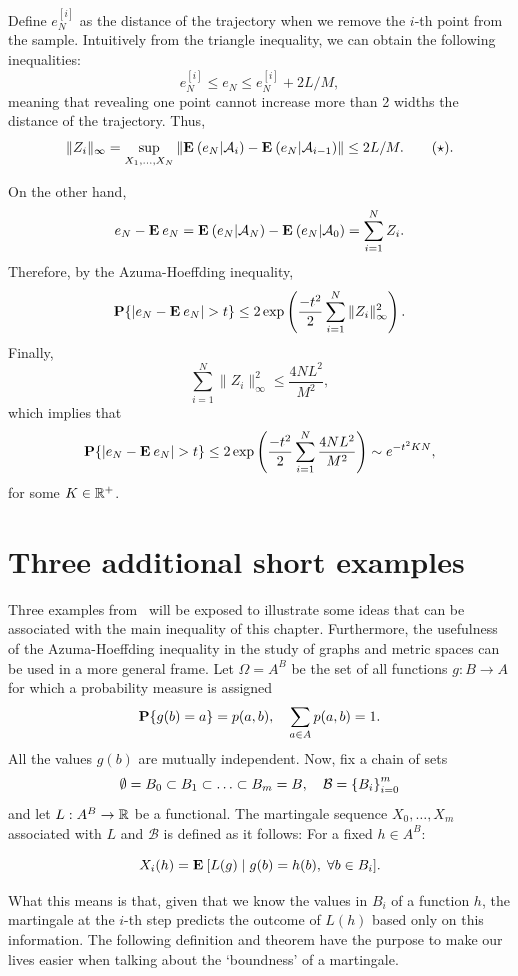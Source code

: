 Define $e_N^{[i]}$ as the distance of the trajectory when we remove the $i$-th point from the sample. Intuitively from the triangle inequality, we can obtain the following inequalities:
\[ e_N^{[i]} \leq e_N \leq e_N^{[i]} + 2 L/M, \]
meaning that revealing one point cannot increase more than 2 widths the distance of the trajectory. Thus,
\[ \|Z_i\|_\infty = \sup_{X_1,\ldots, X_N} \|\E (e_N | \A_i) - \E (e_N | \A_{i-1})\| \leq 2L/M. \tag*{$ (\star)$}.\]

On the other hand,
\[  e_N - \E e_N = \E (e_N | \A_N) - \E (e_N | \A_{0}) = \sum_{i = 1}^{N} Z_i.\]
Therefore, by the Azuma-Hoeffding inequality,
\[ \P \{ |e_N - \E e_N| > t \} \leq 2\exp\left(\frac{-t^2}{2}\sum_{i = 1}^{N} \|Z_i\|_{\infty}^2 \right). \] 
Finally,
\[ \sum_{i = 1}^{N} \|Z_i\|_{\infty}^2 \leq \frac{4NL^2}{M^2}, \]
which implies that
\[\P \{ |e_N - \E e_N| > t \} \leq 2\exp\left(\frac{-t^2}{2}\sum_{i = 1}^{N} \frac{4NL^2}{M^2} \right) \sim e^{-t^{2} K N}, \] 
for some $K\in \R^+$.

\section{Three additional short examples}

Three examples from~\cite{alon2016probabilistic} will be exposed to illustrate some ideas that can be associated with the main inequality of this chapter. Furthermore, the usefulness of the Azuma-Hoeffding inequality in the study of graphs and metric spaces can be used in a more general frame. Let $\Omega = A^B$ be the set of all functions $g: B\to A$ for which a probability measure is assigned
\[ \P\{g(b) = a\} = p(a,b),\hspace*{1em} \sum_{a\in A} p(a,b) = 1. \]
All the values $g(b)$ are mutually independent. Now, fix a chain of sets 
\[ \emptyset = B_0 \subset B_1 \subset \ldots \subset B_m = B,\hspace*{1em} \mathcal{B} = {\{B_i\}}_{i = 0}^m \]
and let $L: A^B \to \R$ be a functional. The martingale sequence $X_0,\ldots, X_m$ associated with $L$ and $\mathcal{B}$ is defined as it follows: For a fixed $h \in A^B$:

\[ X_i(h) = \E[ L(g) \;|\; g(b) = h(b),\; \forall b\in B_i ]. \] 

What this means is that, given that we know the values in $B_i$ of a function $h$, the martingale at the $i$-th step predicts the outcome of $L(h)$ based only on this information. The following definition and theorem have the purpose to make our lives easier when talking about the `boundness' of a martingale.


